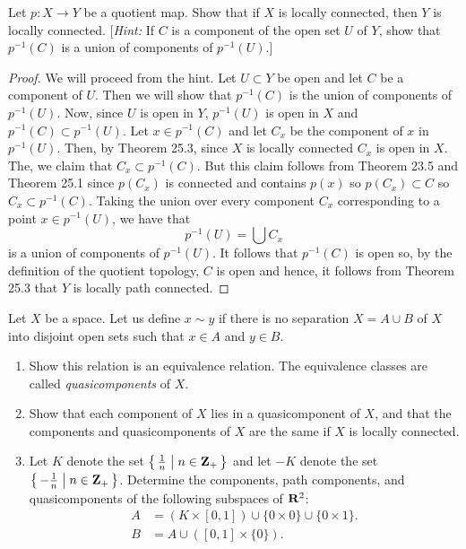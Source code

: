 \begin{problem}[Munkres \S25, Ex.\,8]
Let $p\colon X\to Y$ be a quotient map. Show that if $X$ is
locally connected, then $Y$ is locally connected. [\emph{Hint:}
If $C$ is a component of the open set $U$ of $Y$, show that
$p^{-1}(C)$ is a union of components of $p^{-1}(U)$.]
\end{problem}
\begin{proof}
We will proceed from the hint. Let $U\subset Y$ be open and let
$C$ be a component of $U$. Then we will show that $p^{-1}(C)$ is
the union of components of $p^{-1}(U)$. Now, since $U$ is open in
$Y$, $p^{-1}(U)$ is open in $X$ and $p^{-1}(C)\subset
p^{-1}(U)$. Let $x\in p^{-1}(C)$ and let $C_x$ be the component
of $x$ in $p^{-1}(U)$. Then, by Theorem 25.3, since $X$ is
locally connected $C_x$ is open in $X$. The, we claim that
$C_x\subset p^{-1}(C)$. But this claim follows from Theorem 23.5
and Theorem 25.1 since $p(C_x)$ is connected and contains $p(x)$
so $p(C_x)\subset C$ so $C_x\subset p^{-1}(C)$. Taking the union
over every component $C_x$ corresponding to a point $x\in p^{-1}(U)$, we
have that
\[
p^{-1}(U)=\bigcup C_x
\]
is a union of components of $p^{-1}(U)$. It follows that
$p^{-1}(C)$ is open so, by the definition of the quotient
topology, $C$ is open and hence, it follows from Theorem 25.3
that $Y$ is locally path connected.
\end{proof}
\newpage
\begin{problem}[Munkres \S25, Ex.\,10(a,b)]
Let $X$ be a space. Let us define $x\sim y$ if there is no
separation $X=A\cup B$ of $X$ into disjoint open sets such that
$x\in A$ and $y\in B$.
\begin{enumerate}[label=(\alph*)]
\item Show this relation is an equivalence relation. The
  equivalence classes are called \emph{quasicomponents} of $X$.
\item Show that each component of $X$ lies in a quasicomponent of
  $X$, and that the components and quasicomponents of $X$ are the
  same if $X$ is locally connected.
\item Let $K$ denote the set
  $\left\{\,\frac{1}{n}\;\middle|\;n\in\mathbf{Z}_+\,\right\}$ and let
  $-K$ denote the set
  $\left\{\,-\frac{1}{n}\;\middle|\;n\in\mathbf{Z}_+\,\right\}$. Determine
  the components, path components, and quasicomponents of the
  following subspaces of $\mathbf{R}^2$:
  \begin{align*}
    A&=(K\times[0,1])\cup\{0\times 0\}\cup\{0\times 1\}.\\
    B&=A\cup([0,1]\times\{0\}).\\
  \end{align*}
\end{enumerate}
\end{problem}
